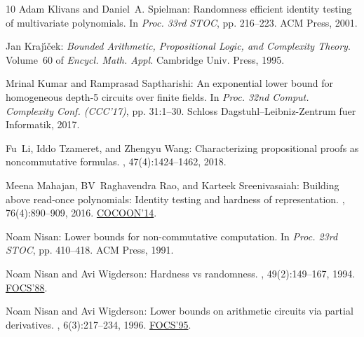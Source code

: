 \documentclass[11pt]{article}
\numberwithin{equation}{section}
\theoremstyle{definition}
\theoremstyle{plain}
\begin{document}
\begin{thebibliography}{10}
{\sc Adam Klivans and Daniel~A. Spielman}: Randomness efficient identity
  testing of multivariate polynomials.
\newblock In {\em Proc. 33rd STOC}, pp. 216--223. ACM Press, 2001.
\newblock [\epfmtdoi{10.1145/380752.380801}]

{\sc Jan Kraj{\'{\i}}{\v{c}}ek}: {\em Bounded Arithmetic, Propositional Logic,
  and Complexity Theory}.
\newblock Volume~60 of {\em Encycl. Math. Appl.}
\newblock Cambridge Univ. Press, 1995.

{\sc Mrinal Kumar and Ramprasad Saptharishi}: An exponential lower bound for
  homogeneous depth-5 circuits over finite fields.
\newblock In {\em Proc. 32nd Comput. Complexity Conf. (CCC'17)}, pp. 31:1--30.
  Schloss Dagstuhl--Leibniz-Zentrum fuer Informatik, 2017.

{\sc Fu~Li, Iddo Tzameret, and Zhengyu Wang}: Characterizing propositional
  proofs as noncommutative formulas.
, 47(4):1424--1462, 2018.

{\sc Meena Mahajan, BV~Raghavendra Rao, and Karteek Sreenivasaiah}: Building
  above read-once polynomials: Identity testing and hardness of representation.
, 76(4):890--909, 2016.
\newblock \prelim
  \href{https://doi.org/10.1007/978-3-319-08783-2_1}{COCOON'14}.

{\sc Noam Nisan}: Lower bounds for non-commutative computation.
\newblock In {\em Proc. 23rd STOC}, pp. 410--418. ACM Press, 1991.
\newblock [\epfmtdoi{10.1145/103418.103462}]

{\sc Noam Nisan and Avi Wigderson}: Hardness vs randomness.
, 49(2):149--167, 1994.
\newblock \prelim \href{https://doi.org/10.1109/SFCS.1988.21916}{FOCS'88}.
\newblock [\epfmtdoi{10.1016/S0022-0000(05)80043-1}]

{\sc Noam Nisan and Avi Wigderson}: Lower bounds on arithmetic circuits via
  partial derivatives.
, 6(3):217--234, 1996.
\newblock \prelim \href{https://doi.org/10.1109/SFCS.1995.492458}{FOCS'95}.
\newblock [\epfmtdoi{10.1007/BF01294256}]


\end{thebibliography}
\end{document}
